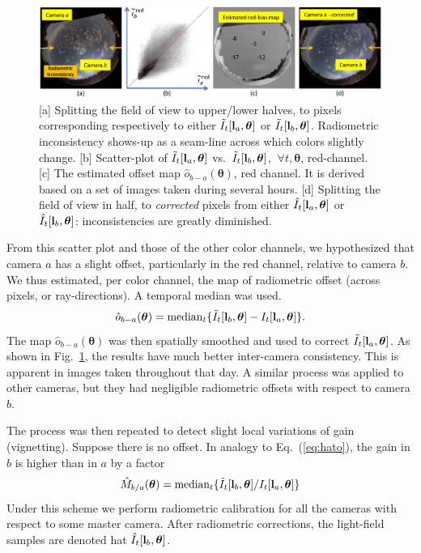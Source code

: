 \documentclass[runningheads]{llncs}
\begin{document}
\begin{figure}[t!]
\begin{center}
   \includegraphics[width=\linewidth]{figures/bias4.eps}
\end{center}
   \vspace{-0.6cm}
   \caption{[a] Splitting the field of view to upper/lower halves, to pixels corresponding
   respectively to either $\tilde I_t[{\bf l}_a,{\bm \theta}]$  or $\tilde I_t[{\bf l}_{b},{\bm \theta}]$. Radiometric inconsistency
   shows-up as a seam-line across which colors slightly change. [b] Scatter-plot of
   $\tilde I_t[{\bf l}_a,{\bm \theta}]$ vs.~$\tilde I_t[{\bf l}_{b},{\bm \theta}]$, $~\forall t,{\bm \theta}$, red-channel. [c] The estimated offset map ${\hat o}_{b-a}({\bm \theta})$, red channel. It is derived based on a set of images taken during several hours.
   [d] Splitting the field of view in half, to {\em corrected} pixels from either
   $\hat I_t[{\bf l}_a,{\bm \theta}]$  or $\hat I_t[{\bf l}_{b},{\bm \theta}]$: inconsistencies are greatly
   diminished.
   }
\label{fig:calibration}
\end{figure}
From this scatter plot and those of the other color channels, we hypothesized that camera $a$ has a slight offset, particularly in the red channel, relative to camera $b$. We thus estimated, per color channel, the map of radiometric offset (across pixels, or ray-directions). A temporal median was used.
\begin{equation}
 {\hat o}_{b-a}({\bm \theta})=
  {\rm median}_{t} \{\tilde I_t[{\bf l}_b,{\bm \theta}]-I_t[{\bf l}_a,{\bm \theta}]\}.
 \label{eq:hato}
\end{equation}
The map ${\hat o}_{b-a}({\bm \theta})$ was then spatially smoothed and used to correct $\tilde I_t[{\bf l}_a,{\bm \theta}]$. As shown in Fig.~\ref{fig:calibration}, the results have much better inter-camera consistency. This is apparent in images taken throughout that day. A similar process was applied to other cameras, but they had negligible radiometric offsets with respect to camera $b$.

The process was then repeated to detect slight local variations of gain (vignetting). Suppose there is no offset. In analogy to Eq.~(\ref{eq:hato}), the gain in $b$ is higher than in $a$ by a factor
\begin{equation}
 {\hat M}_{b/a}({\bm \theta})=
  {\rm median}_{t} \{\tilde I_t[{\bf l}_b,{\bm \theta}]/I_t[{\bf l}_a,{\bm \theta}]\}
 \label{eq:hatm}
\end{equation}
Under this scheme we perform radiometric calibration for all the cameras with respect to some master camera.
After radiometric corrections, the light-field samples are denoted hat $\hat I_t[{\bf l}_b,{\bm \theta}]$.
\end{document}
